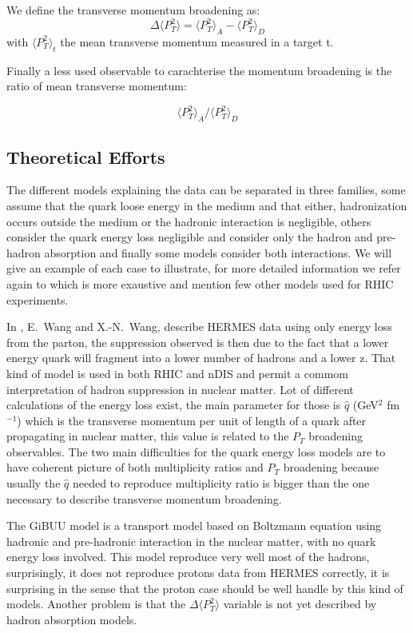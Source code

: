 We define the transverse momentum broadening as:
\begin{equation}
\Delta \langle P_T^2 \rangle = \langle P_T^2 \rangle_A - \langle P_T^2 \rangle_D
\end{equation}
with $\langle P_T^2 \rangle_t$ the mean transverse momentum measured in a target t.

Finally a less used observable to carachterise the momentum broadening is the ratio
of mean transverse momentum:

\begin{equation}
\langle P_T^2 \rangle_A / \langle P_T^2 \rangle_D
\end{equation}


\subsection{Theoretical Efforts}
\label{sec:theo}

The different models explaining the data can be separated in three families,
some assume that the quark loose energy in the medium and that either, hadronization occurs
outside the medium or the hadronic interaction is 
negligible, others consider the quark energy loss negligible and consider
only the hadron and pre-hadron absorption and finally some models consider both
interactions. We will give an example of each case to illustrate, for more
detailed information we refer again to \cite{Accardi:2009qv} which is more exaustive and
mention few other models used for RHIC experiments.

In \cite{Wang:2002ri}, E.~Wang and X.-N.~Wang, describe HERMES data using only energy 
loss from the parton, the suppression observed is then due to the fact that a 
lower energy quark will fragment into a lower number of hadrons and a lower 
z. That kind of model is used in both RHIC and nDIS and permit a commom 
interpretation of hadron suppression in nuclear matter. Lot of different
calculations of the energy loss exist, the main parameter for those is $\hat q$
(GeV$^2$ fm$^{-1}$) which is the transverse momentum per unit of length of a quark after propagating
in nuclear matter, this value is related to the $P_T$ 
broadening observables. The two main difficulties for the quark energy loss
models are to have coherent picture of both multiplicity ratios and $P_T$ 
broadening because usually the $\hat q$ needed to reproduce multiplicity ratio
is bigger than the one necessary to describe transverse momentum broadening.

The GiBUU model \cite{Gallmeister:2007an} is a transport model based on Boltzmann equation
using hadronic and pre-hadronic interaction in the nuclear matter, with no
quark energy loss involved. This model reproduce very well most of the hadrons, 
surprisingly, it does not reproduce protons
data from HERMES correctly, it is surprising in the sense that the proton
case should be well handle by this kind of models. Another problem 
is that the $\Delta \langle P_T^2 \rangle$ variable is not yet described by 
hadron absorption models.

